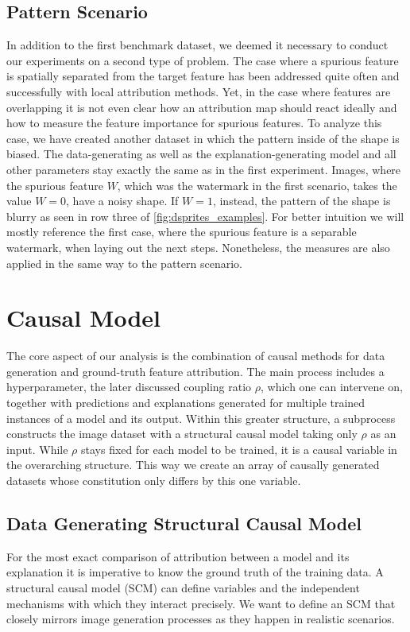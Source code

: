 \subsection{Pattern Scenario}\label{section:dataset_overlap}
In addition to the first benchmark dataset, we deemed it necessary to conduct our experiments on a second type of problem.
The case where a spurious feature is spatially separated from the target feature has been addressed quite often and successfully with local attribution methods. Yet, in the case where features are overlapping it is not even clear how an attribution map should react ideally and how to measure the feature importance for spurious features. To analyze this case, we have created another dataset in which the pattern inside of the shape is biased. The data-generating as well as the explanation-generating model and all other parameters stay exactly the same as in the first experiment.
Images, where the spurious feature $W$, which was the watermark in the first scenario, takes the value $W=0$, have a noisy shape. If $W= 1$, instead, the pattern of the shape is blurry as seen in row three of \cref{fig:dsprites_examples}. 
For better intuition we will mostly reference the first case, where the spurious feature is a separable watermark, when laying out the next steps. Nonetheless, the measures are also applied in the same way to the pattern scenario. 

\section{Causal Model}\label{section:causal_model}
The core aspect of our analysis is the combination of causal methods for data generation and ground-truth feature attribution. 
The main process includes a hyperparameter, the later discussed coupling ratio $\rho$, which one can intervene on, together with predictions and explanations generated for multiple trained instances of a model and its output. 
Within this greater structure, a subprocess constructs the image dataset with a structural causal model taking only $\rho$ as an input. While $\rho$ stays fixed for each model to be trained, it is a causal variable in the overarching structure. This way we create an array of causally generated datasets whose constitution only differs by this one variable. 

\subsection{Data Generating Structural Causal Model}\label{section:data_gen_causal_model}
For the most exact comparison of attribution between a model and its explanation it is imperative to know the ground truth of the training data. A structural causal model (SCM) can define variables and the independent mechanisms with which they interact precisely. We want to define an SCM that closely mirrors image generation processes as they happen in realistic scenarios. 

